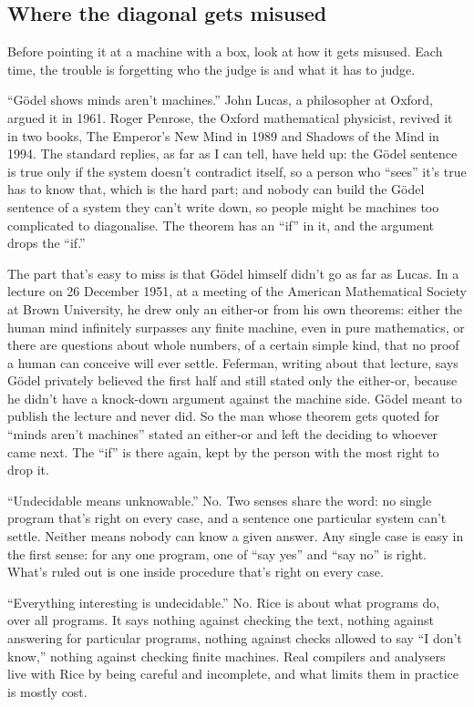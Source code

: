 \documentclass[11pt,twoside]{article}
\theoremstyle{thielethm}
\theoremstyle{thieledef}
\theoremstyle{thieledef}
\theoremstyle{thieledef}
\theoremstyle{thielethm}
\theoremstyle{thieleobs}
\theoremstyle{thielethm}
\begin{document}
\subsection{Where the diagonal gets misused}

Before pointing it at a machine with a box, look at how it gets misused. Each time, the trouble is forgetting who the judge is and what it has to judge.

``Gödel shows minds aren't machines.'' John Lucas, a philosopher at Oxford, argued it in 1961. Roger Penrose, the Oxford mathematical physicist, revived it in two books, The Emperor's New Mind in 1989 and Shadows of the Mind in 1994. The standard replies, as far as I can tell, have held up: the Gödel sentence is true only if the system doesn't contradict itself, so a person who ``sees'' it's true has to know that, which is the hard part; and nobody can build the Gödel sentence of a system they can't write down, so people might be machines too complicated to diagonalise. The theorem has an ``if'' in it, and the argument drops the ``if.''

The part that's easy to miss is that Gödel himself didn't go as far as Lucas. In a lecture on 26 December 1951, at a meeting of the American Mathematical Society at Brown University, he drew only an either-or from his own theorems: either the human mind infinitely surpasses any finite machine, even in pure mathematics, or there are questions about whole numbers, of a certain simple kind, that no proof a human can conceive will ever settle. Feferman, writing about that lecture, says Gödel privately believed the first half and still stated only the either-or, because he didn't have a knock-down argument against the machine side. Gödel meant to publish the lecture and never did. So the man whose theorem gets quoted for ``minds aren't machines'' stated an either-or and left the deciding to whoever came next. The ``if'' is there again, kept by the person with the most right to drop it.

``Undecidable means unknowable.'' No. Two senses share the word: no single program that's right on every case, and a sentence one particular system can't settle. Neither means nobody can know a given answer. Any single case is easy in the first sense: for any one program, one of ``say yes'' and ``say no'' is right. What's ruled out is one inside procedure that's right on every case.

``Everything interesting is undecidable.'' No. Rice is about what programs do, over all programs. It says nothing against checking the text, nothing against answering for particular programs, nothing against checks allowed to say ``I don't know,'' nothing against checking finite machines. Real compilers and analysers live with Rice by being careful and incomplete, and what limits them in practice is mostly cost.
\end{document}
